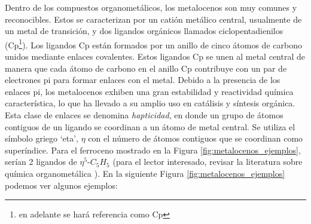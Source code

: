 Dentro de los compuestos organometálicos, los metalocenos son muy comunes y reconocibles. Estos se caracterizan por un catión metálico central, usualmente de un metal de transición, y dos ligandos orgánicos llamados ciclopentadienilos (Cp\footnote{en adelante se hará referencia como Cp}). Los ligandos Cp están formados por un anillo de cinco átomos de carbono unidos mediante enlaces covalentes. Estos ligandos Cp se unen al metal central de manera que cada átomo de carbono en el anillo Cp contribuye con un par de electrones pi para formar enlaces con el metal. Debido a la presencia de los enlaces pi, los metalocenos exhiben una gran estabilidad y reactividad química característica, lo que ha llevado a su amplio uso en catálisis y síntesis orgánica. Esta clase de enlaces se denomina \textit{hapticidad}, en donde un grupo de átomos contiguos de un ligando se coordinan a un átomo de metal central. Se utiliza el símbolo griego `eta', $\eta$ con el número de átomos contiguos que se coordinan como superíndice. Para el ferroceno mostrado en la Figura \ref{fig:metalocenos_ejemplos}, serían 2 ligandos de $\eta^{5}$-$C_{5}H_{5}$ (para el lector interesado, revisar la literatura sobre química organometálica \cite{jose_curso_1995, fajarnes_quimica_1997, osorio-yanez_compuestos_2021, organometallic_hypertextbook, libretext_organometallic_2013}). En la siguiente Figura \ref{fig:metalocenos_ejemplos} podemos ver algunos ejemplos:
